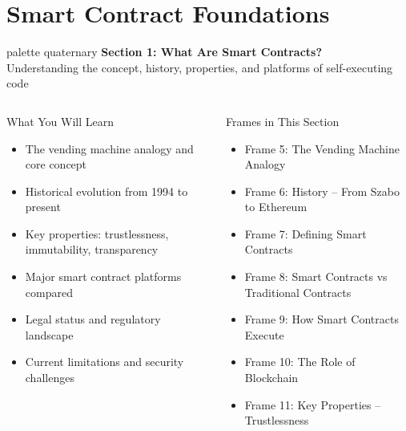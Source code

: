 \documentclass[8pt,aspectratio=169]{beamer}
\begin{document}
\section{Smart Contract Foundations}

\begin{frame}{}
\begin{beamercolorbox}[sep=12pt,center,rounded=true,shadow=true]{palette quaternary}
  {\Large\bfseries Section 1: What Are Smart Contracts?}\\[6pt]
  {\normalsize Understanding the concept, history, properties, and platforms of self-executing code}
\end{beamercolorbox}
\vspace{4mm}
\begin{columns}[T]
\begin{block}{What You Will Learn}
\footnotesize
\begin{itemize}
  \item The vending machine analogy and core concept
  \item Historical evolution from 1994 to present
  \item Key properties: trustlessness, immutability, transparency
  \item Major smart contract platforms compared
  \item Legal status and regulatory landscape
  \item Current limitations and security challenges
\end{itemize}
\end{block}
\begin{block}{Frames in This Section}
\footnotesize
\begin{itemize}
  \item Frame 5: The Vending Machine Analogy
  \item Frame 6: History -- From Szabo to Ethereum
  \item Frame 7: Defining Smart Contracts
  \item Frame 8: Smart Contracts vs Traditional Contracts
  \item Frame 9: How Smart Contracts Execute
  \item Frame 10: The Role of Blockchain
  \item Frame 11: Key Properties -- Trustlessness

\end{itemize}
\end{block}
\end{columns}
\end{frame}
\end{document}

